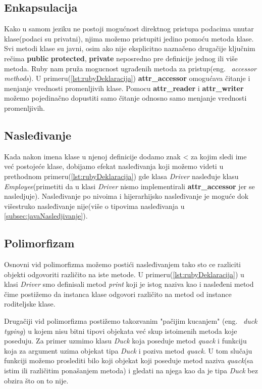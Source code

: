\documentclass[a4paper]{article}
\begin{document}
{\subsection{Enkapsulacija}
\label{subsec:rubyEnkapsulacija}
Kako u samom jeziku ne postoji mogućnost direktnog pristupa podacima unutar klase(podaci su privatni), njima možemo pristupiti jedino pomoću metoda klase. Svi metodi klase su javni, osim ako nije eksplicitno naznačeno drugačije ključnim rečima \textbf{public} \textbf{protected}, \textbf{private} neposredno pre definicije jednog ili više metoda. Ruby nam pruža mogucnost ugrađenih metoda za pristup(eng. ~{\em accessor methods}). U primeru(\ref{lst:rubyDeklaracija})  \textbf{attr\_accessor} omogućava čitanje i menjanje vrednosti promenljivih klase. Pomocu \textbf{attr\_reader} i \textbf{attr\_writer} možemo pojedinačno dopustiti samo čitanje odnosno samo menjanje vrednosti promenljivih.

\subsection{Nasleđivanje}
\label{subsec:rubyNasledjivanje}
Kada nakon imena klase u njenoj definicije dodamo znak < za kojim sledi ime već postojeće klase, dobijamo efekat nasleđivanja koji možemo videti u prethodnom primeru(\ref{lst:rubyDeklaracija}) gde klasa \textit{Driver} nasleđuje klasu \textit{Employee}(primetiti da u klasi \textit{Driver} nismo implementirali \textbf{attr\_accessor} jer se nasledjuje). Nasleđivanje po nivoima i hijerarhijsko nasleđivanje je moguće dok višestruko nasleđivanje nije(više o tipovima nasleđivanja u \ref{subsec:javaNasledjivanje}).

\subsection{Polimorfizam}
\label{subsec:rubyPolimorfizam}
Osnovni vid polimorfizma možemo postići nasleđivanjem tako sto ce razliciti objekti odgovoriti različito na iste metode. U primeru(\ref{lst:rubyDeklaracija}) u klasi \textit{Driver} smo definisali metod \textit{print} koji je istog naziva kao i nasleđeni metod čime postižemo da instanca klase odgovori različito na metod od instance roditeljske klase. 

Drugačiji vid polimorfizma postižemo takozvanim "pačijim kucanjem" (eng. ~{\em duck typing}) u kojem nisu bitni tipovi objekata već skup istoimenih metoda koje poseduju. Za primer uzmimo klasu \textit{Duck} koja poseduje metod  \textit{quack} i funkciju koja za argument uzima objekat tipa \textit{Duck} i poziva metod \textit{quack}. U tom slučaju funkciji možemo proslediti bilo koji objekat koji poseduje metod naziva \textit{quack}(sa istim ili različitim ponašanjem metoda) i gledati na njega kao da je tipa \textit{Duck} bez obzira što on to nije.

}
\end{document}
